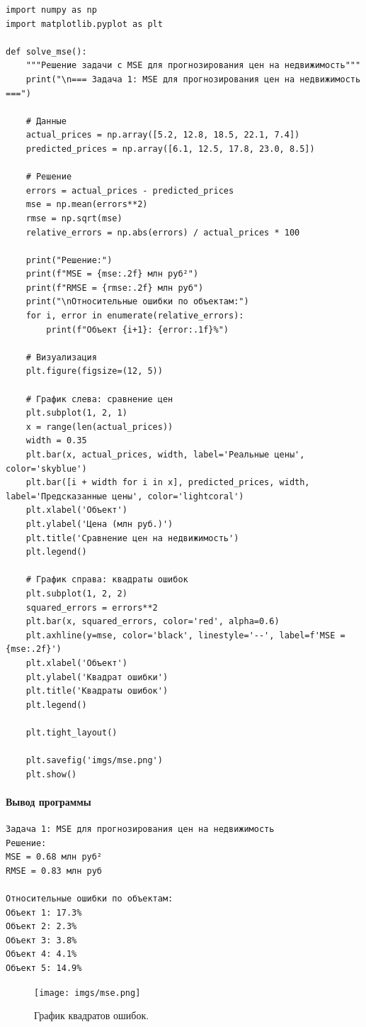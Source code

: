 \begin{verbatim}
import numpy as np
import matplotlib.pyplot as plt

def solve_mse():
    """Решение задачи с MSE для прогнозирования цен на недвижимость"""
    print("\n=== Задача 1: MSE для прогнозирования цен на недвижимость ===")
    
    # Данные
    actual_prices = np.array([5.2, 12.8, 18.5, 22.1, 7.4])
    predicted_prices = np.array([6.1, 12.5, 17.8, 23.0, 8.5])
    
    # Решение
    errors = actual_prices - predicted_prices
    mse = np.mean(errors**2)
    rmse = np.sqrt(mse)
    relative_errors = np.abs(errors) / actual_prices * 100
    
    print("Решение:")
    print(f"MSE = {mse:.2f} млн руб²")
    print(f"RMSE = {rmse:.2f} млн руб")
    print("\nОтносительные ошибки по объектам:")
    for i, error in enumerate(relative_errors):
        print(f"Объект {i+1}: {error:.1f}%")
    
    # Визуализация
    plt.figure(figsize=(12, 5))
    
    # График слева: сравнение цен
    plt.subplot(1, 2, 1)
    x = range(len(actual_prices))
    width = 0.35
    plt.bar(x, actual_prices, width, label='Реальные цены', color='skyblue')
    plt.bar([i + width for i in x], predicted_prices, width, label='Предсказанные цены', color='lightcoral')
    plt.xlabel('Объект')
    plt.ylabel('Цена (млн руб.)')
    plt.title('Сравнение цен на недвижимость')
    plt.legend()
    
    # График справа: квадраты ошибок
    plt.subplot(1, 2, 2)
    squared_errors = errors**2
    plt.bar(x, squared_errors, color='red', alpha=0.6)
    plt.axhline(y=mse, color='black', linestyle='--', label=f'MSE = {mse:.2f}')
    plt.xlabel('Объект')
    plt.ylabel('Квадрат ошибки')
    plt.title('Квадраты ошибок')
    plt.legend()
    
    plt.tight_layout()
    
    plt.savefig('imgs/mse.png')
    plt.show()
\end{verbatim}

\paragraph{Вывод программы}
\begin{verbatim}
Задача 1: MSE для прогнозирования цен на недвижимость
Решение:
MSE = 0.68 млн руб²
RMSE = 0.83 млн руб

Относительные ошибки по объектам:
Объект 1: 17.3%
Объект 2: 2.3%
Объект 3: 3.8%
Объект 4: 4.1%
Объект 5: 14.9%
\end{verbatim}
\begin{figure}[h!]
    \centering
    \texttt{[image: imgs/mse.png]}
    \caption{График квадратов ошибок.}
    \label{fig:mse_graph}
\end{figure}

